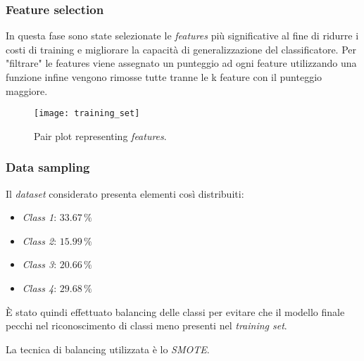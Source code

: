                 
                \subsubsection{Feature selection}
                
                        In questa fase sono state selezionate le \textit{features} più significative al fine di ridurre i costi di training e migliorare la capacità di generalizzazione del classificatore.
                        Per "filtrare" le features viene assegnato un punteggio ad ogni feature utilizzando una funzione infine vengono rimosse tutte tranne le k feature con il punteggio maggiore.
                   
                        
                        \begin{figure}[!h]
                            \centering
                            \texttt{[image: training\_set]}
                            \caption{Pair plot representing \textit{features}.}
                            \label{fig:training_set_pairplot}
                        \end{figure}
                        \clearpage
                
                \subsubsection{Data sampling} 
                
                        Il \textit{dataset} considerato presenta elementi così distribuiti:
                        \begin{itemize}
                                \item \textit{Class 1}: $33.67 \, \%$
                                \item \textit{Class 2}: $15.99 \, \%$
                                \item \textit{Class 3}: $20.66 \, \%$
                                \item \textit{Class 4}: $29.68 \, \%$
                        \end{itemize}
                        
                        \`E stato quindi effettuato balancing delle classi per evitare che il modello finale pecchi nel riconoscimento di classi meno presenti nel \textit{training set}.
                        
                        La tecnica di balancing utilizzata è lo \textit{SMOTE}.
                        

